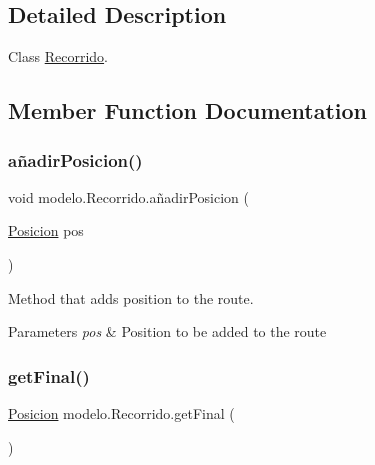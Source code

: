 \subsection{Detailed Description}
Class \mbox{\hyperlink{classmodelo_1_1_recorrido}{Recorrido}}. 

\subsection{Member Function Documentation}
\mbox{\label{classmodelo_1_1_recorrido_a898fb136038eb311de6ff6eaba592939}} 
\subsubsection{\texorpdfstring{añadir\+Posicion()}{añadirPosicion()}}
{\footnotesize\ttfamily void modelo.\+Recorrido.\+añadir\+Posicion (\begin{DoxyParamCaption}\item[{\mbox{\hyperlink{classmodelo_1_1_posicion}{Posicion}}}]{pos }\end{DoxyParamCaption})}



Method that adds position to the route. 


\begin{DoxyParams}{Parameters}
{\em pos} & Position to be added to the route \\
\hline
\end{DoxyParams}
\mbox{\label{classmodelo_1_1_recorrido_a553b3ffc252f878460d5d6ed55ea61fb}} 
\subsubsection{\texorpdfstring{get\+Final()}{getFinal()}}
{\footnotesize\ttfamily \mbox{\hyperlink{classmodelo_1_1_posicion}{Posicion}} modelo.\+Recorrido.\+get\+Final (\begin{DoxyParamCaption}{ }\end{DoxyParamCaption})}



